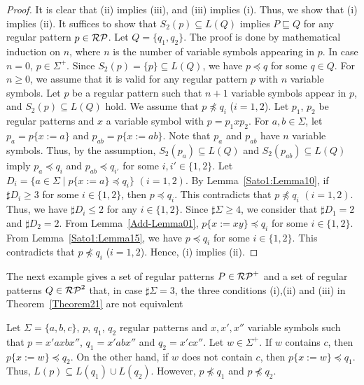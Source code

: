 \begin{proof}
    It is clear that (ii) implies (iii), and (iii) implies (i).
    Thus, we show that (i) implies (ii).
    It suffices to show that $S_{2}(p) \subseteq L(Q)$ implies $P \sqsubseteq Q$
    for any regular pattern $p \in \mathcal{RP}$.
    Let $Q = \{q_{1}, q_{2}\}$.
    The proof is done by mathematical induction on $n$,
    where $n$ is the number of variable symbols appearing in $p$.
    In case $n=0$, $p \in \Sigma^{+}$.
    Since $S_{2}(p) = \{p\} \subseteq L(Q)$, we have $p \preceq q$
    for some $q \in Q$.
    For $n \geq 0$, we assume that it is valid for any regular pattern $p$ with
    $n$ variable symbols.
    Let $p$ be a regular pattern such that $n+1$ variable symbols appear in $p$,
    and $S_{2}(p) \subseteq L(Q)$ hold.
    We assume that $p \not\preceq q_{i}$ ($i=1,2$).
    Let $p_{1}$, $p_{2}$ be regular patterns and $x$ a variable symbol
    with $p = p_{1}xp_{2}$.
    For $a, b \in \Sigma$,
    let $p_{a} = p\{x:=a\}$ and $p_{ab} = p\{x:=ab\}$.
    Note that $p_{a}$ and $p_{ab}$ have $n$ variable symbols.
    Thus, by the assumption,
    $S_{2}(p_{a}) \subseteq L(Q)$ and $S_{2}(p_{ab}) \subseteq L(Q)$
    imply $p_{a} \preceq q_{i}$ and $p_{ab} \preceq q_{i'}$ for some
    $i, i' \in \{1,2\}$.
    Let $D_{i} = \{a \in \Sigma \mid p\{x:=a\} \preceq q_{i}\}$ $(i=1,2)$.
    By Lemma~\ref{Sato1:Lemma10},
    if $\sharp D_{i} \geq 3$ for some $i \in \{1,2\}$,
    then $p \preceq q_{i}$.
    This contradicts that $p \not\preceq q_{i}$ $(i=1,2)$.
    Thus, we have $\sharp D_{i} \leq 2$ for any $i \in \{1,2\}$.
    Since $\sharp \Sigma \geq 4$,
    we consider that $\sharp D_{1}=2$ and $\sharp D_{2} = 2$.
    From Lemma~\ref{Add-Lemma01},
    $p\{x:=xy\} \preceq q_{i}$ for some $i \in \{1,2\}$.
    From Lemma~\ref{Sato1:Lemma15}, 
    we have $p \preceq q_{i}$ for some $i \in \{1,2\}$.
    This contradicts that $p \not\preceq q_{i}$ ($i=1,2$).
    Hence, (i) implies (ii).
    \end{proof}

The next example gives a set of regular patterns $P \in \mathcal{RP}^{+}$ and a set of regular patterns $Q \in \mathcal{RP}^{2}$ that, 
in case $\sharp\Sigma = 3$, 
the three conditions (i),(ii) and (iii) in Theorem~\ref{Theorem21} are not equivalent

\begin{ex}
    Let $\Sigma = \{a,b,c\}$, $p$, $q_{1}$, $q_{2}$ regular patterns and
    $x,x',x''$ variable symbols such that
    $p = x'axbx''$, $q_{1} = x'abx''$ and $q_{2} = x'cx''$.
    Let $w \in \Sigma^{+}$.
    If $w$ contains $c$, then $p \{x:=w\} \preceq q_{2}$.
    On the other hand, if $w$ does not contain $c$,
    then $p\{x:=w\} \preceq q_{1}$.
    Thus, $L(p) \subseteq L(q_{1}) \cup L(q_{2})$.
    However, $p \not\preceq q_{1}$ and $p \not\preceq q_{2}$.
\end{ex}

